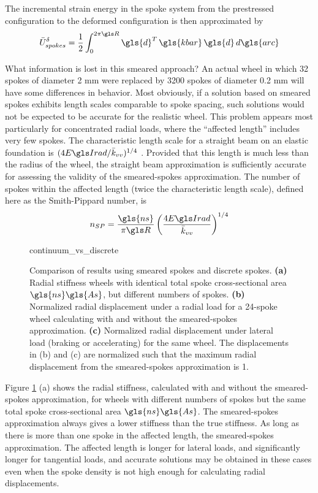 \documentclass[\rootdir/thesis.tex]{subfiles}
\begin{document}
The incremental strain energy in the spoke system from the prestressed configuration to the deformed configuration is then approximated by
\begin{equation}
\label{eq:dU_spokes_cont}
\bar{U}_{spokes}^{\delta} = \frac{1}{2}\int_0^{2\pi \R} \gls{d}^T\, \gls{kbar}\, \gls{d} \, d\gls{arc}
\end{equation}

What information is lost in this smeared approach? An actual wheel in which 32 spokes of diameter 2 mm were replaced by 3200 spokes of diameter 0.2 mm will have some differences in behavior. Most obviously, if a solution based on smeared spokes exhibits length scales comparable to spoke spacing, such solutions would not be expected to be accurate for the realistic wheel. This problem appears most particularly for concentrated radial loads, where the ``affected length'' includes very few spokes. The characteristic length scale for a straight beam on an elastic foundation is $(4\EIr/\kvv)^{1/4}$ \cite{Hetenyi1946}. Provided that this length is much less than the radius of the wheel, the straight beam approximation is sufficiently accurate for assessing the validity of the smeared-spokes approximation. The number of spokes within the affected length (twice the characteristic length scale), defined here as the Smith-Pippard number, is
\begin{equation}
n_{SP} = \frac{\gls{ns}}{\pi \R} \left(\frac{4\EIr}{\kvv}\right)^{1/4}
\end{equation}

\begin{figure}[t]
\centering
{continuum_vs_discrete}
\caption{Comparison of results using smeared spokes and discrete spokes. \textbf{(a)} Radial stiffness wheels with identical total spoke cross-sectional area $\gls{ns}\gls{As}$, but different numbers of spokes. \textbf{(b)} Normalized radial displacement under a radial load for a 24-spoke wheel calculating with and without the smeared-spokes approximation. \textbf{(c)} Normalized radial displacement under lateral load (braking or accelerating) for the same wheel. The displacements in (b) and (c) are normalized such that the maximum radial displacement from the smeared-spokes approximation is 1.}
\label{fig:continuum_vs_discrete}
\end{figure}

Figure \ref{fig:continuum_vs_discrete} (a) shows the radial stiffness, calculated with and without the smeared-spokes approximation, for wheels with different numbers of spokes but the same total spoke cross-sectional area $\gls{ns}\gls{As}$. The smeared-spokes approximation always gives a lower stiffness than the true stiffness. As long as there is more than one spoke in the affected length, the smeared-spokes approximation. The affected length is longer for lateral loads, and significantly longer for tangential loads, and accurate solutions may be obtained in these cases even when the spoke density is not high enough for calculating radial displacements.
\end{document}
